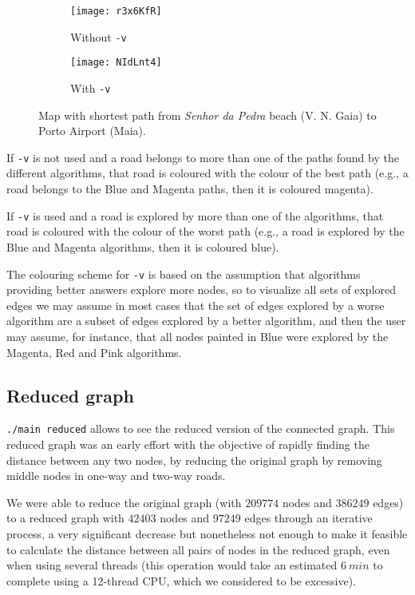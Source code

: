 \begin{figure}[h]
    \centering
    \begin{subfigure}{.49\textwidth}
        \centering
        \texttt{[image: r3x6KfR]}
        \caption{Without \texttt{-v}}
    \end{subfigure}
    \begin{subfigure}{.49\textwidth}
        \centering
        \texttt{[image: NIdLnt4]}
        \caption{With \texttt{-v}}
    \end{subfigure}
    \caption{Map with shortest path from \textit{Senhor da Pedra} beach (V. N. Gaia) to Porto Airport (Maia).}
\end{figure}

If \texttt{-v} is not used and a road belongs to more than one of the paths found by the different algorithms, that road is coloured with the colour of the best path (e.g., a road belongs to the Blue and Magenta paths, then it is coloured magenta).\par
If \texttt{-v} is used and a road is explored by more than one of the algorithms, that road is coloured with the colour of the worst path (e.g., a road is explored by the Blue and Magenta algorithms, then it is coloured blue).\par
The colouring scheme for \texttt{-v} is based on the assumption that algorithms providing better answers explore more nodes, so to visualize all sets of explored edges we may assume in most cases that the set of edges explored by a worse algorithm are a subset of edges explored by a better algorithm, and then the user may assume, for instance, that all nodes painted in Blue were explored by the Magenta, Red and Pink algorithms.

\subsection{Reduced graph}
\texttt{./main reduced} allows to see the reduced version of the connected graph. This reduced graph was an early effort with the objective of rapidly finding the distance between any two nodes, by reducing the original graph by removing middle nodes in one-way and two-way roads.\par
We were able to reduce the original graph (with $209774$ nodes and $386249$ edges) to a reduced graph with $42403$ nodes and $97249$ edges through an iterative process, a very significant decrease but nonetheless not enough to make it feasible to calculate the distance between all pairs of nodes in the reduced graph, even when using several threads (this operation would take an estimated $\SI{6}{min}$ to complete using a 12-thread CPU, which we considered to be excessive).

